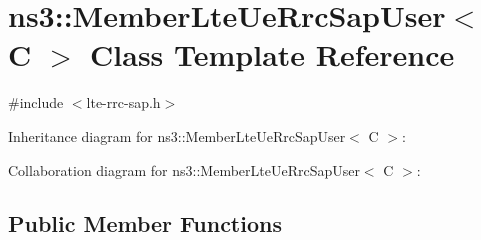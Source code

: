 \hypertarget{classns3_1_1MemberLteUeRrcSapUser}{}\section{ns3\+:\+:Member\+Lte\+Ue\+Rrc\+Sap\+User$<$ C $>$ Class Template Reference}
\label{classns3_1_1MemberLteUeRrcSapUser}


{\ttfamily \#include $<$lte-\/rrc-\/sap.\+h$>$}



Inheritance diagram for ns3\+:\+:Member\+Lte\+Ue\+Rrc\+Sap\+User$<$ C $>$\+:


Collaboration diagram for ns3\+:\+:Member\+Lte\+Ue\+Rrc\+Sap\+User$<$ C $>$\+:
\subsection*{Public Member Functions}
